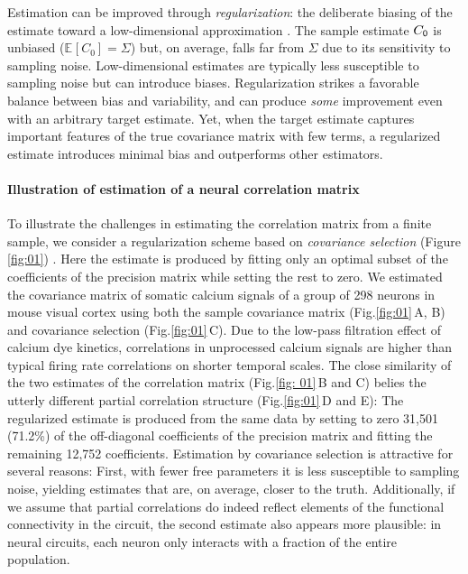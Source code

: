 \documentclass[10pt]{article}
\newcommand{\figref}[2]{Fig.\;\ref{fig:#1}\,#2}
\newcommand{\E}[2][]{\mathbb E_{#1}\left[ #2\right]}    %
\begin{document}
Estimation can be improved through \emph{regularization}: the deliberate biasing of the estimate toward a low-dimensional approximation \cite{Schafer:2005,Bickel:2006}.  The sample estimate $C_{\sf 0}$ is unbiased ($\E{C_0}=\Sigma$) but, on average, falls far from $\Sigma$ due to its sensitivity to sampling noise.  Low-dimensional estimates are typically less susceptible to sampling noise but can introduce biases.  Regularization strikes a favorable balance between bias and variability, and can produce \emph{some} improvement even with an arbitrary target estimate.  Yet, when the target estimate captures important features of the true covariance matrix with few terms, a regularized estimate introduces minimal bias and outperforms other estimators. 

\paragraph{Illustration of estimation of a neural correlation matrix}
To illustrate the challenges in estimating the correlation matrix from a finite sample, we consider a regularization scheme based on \emph{covariance selection} (Figure \ref{fig:01}) \cite{Dempster:1972}. Here the estimate is produced by fitting only an optimal subset of the coefficients of the precision matrix while setting the rest to zero. We estimated the covariance matrix of somatic calcium signals of a group of 298 neurons in mouse visual cortex using both the sample covariance matrix (\figref{01}{A, B}) and covariance selection (\figref{01}{C}). Due to the low-pass filtration effect of calcium dye kinetics, correlations in unprocessed calcium signals are higher than typical firing rate correlations on shorter temporal scales. The close similarity of the two estimates of the correlation matrix (\figref{ 01}{B and C}) belies the utterly different partial correlation structure (\figref{01}{D and E}): The regularized estimate is produced from the same data by setting to zero 31,501 (71.2\%) of the off-diagonal coefficients of the precision matrix and fitting the remaining 12,752 coefficients. Estimation by covariance selection is attractive for several reasons: First, with fewer free parameters it is less susceptible to sampling noise, yielding estimates that are, on average, closer to the truth. Additionally, if we assume that partial correlations do indeed reflect elements of the functional connectivity in the circuit, the second estimate also appears more plausible: in neural circuits, each neuron only interacts with a fraction of the entire population.
\end{document}
